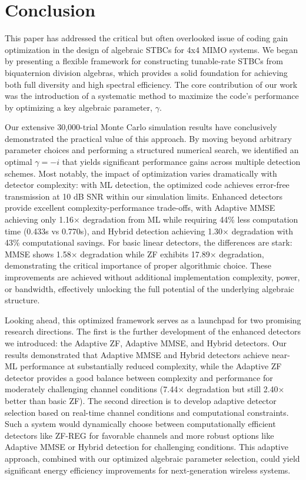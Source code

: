 \section{Conclusion}
This paper has addressed the critical but often overlooked issue of coding gain optimization in the design of algebraic STBCs for 4x4 MIMO systems. We began by presenting a flexible framework for constructing tunable-rate STBCs from biquaternion division algebras, which provides a solid foundation for achieving both full diversity and high spectral efficiency. The core contribution of our work was the introduction of a systematic method to maximize the code's performance by optimizing a key algebraic parameter, \(\gamma\).

Our extensive 30,000-trial Monte Carlo simulation results have conclusively demonstrated the practical value of this approach. By moving beyond arbitrary parameter choices and performing a structured numerical search, we identified an optimal \(\gamma = -i\) that yields significant performance gains across multiple detection schemes. Most notably, the impact of optimization varies dramatically with detector complexity: with ML detection, the optimized code achieves error-free transmission at 10 dB SNR within our simulation limits. Enhanced detectors provide excellent complexity-performance trade-offs, with Adaptive MMSE achieving only 1.16$\times$ degradation from ML while requiring 44\% less computation time (0.433s vs 0.770s), and Hybrid detection achieving 1.30$\times$ degradation with 43\% computational savings. For basic linear detectors, the differences are stark: MMSE shows 1.58$\times$ degradation while ZF exhibits 17.89$\times$ degradation, demonstrating the critical importance of proper algorithmic choice. These improvements are achieved without additional implementation complexity, power, or bandwidth, effectively unlocking the full potential of the underlying algebraic structure.

Looking ahead, this optimized framework serves as a launchpad for two promising research directions. The first is the further development of the enhanced detectors we introduced: the Adaptive ZF, Adaptive MMSE, and Hybrid detectors. Our results demonstrated that Adaptive MMSE and Hybrid detectors achieve near-ML performance at substantially reduced complexity, while the Adaptive ZF detector provides a good balance between complexity and performance for moderately challenging channel conditions (7.44× degradation but still 2.40× better than basic ZF). The second direction is to develop adaptive detector selection based on real-time channel conditions and computational constraints. Such a system would dynamically choose between computationally efficient detectors like ZF-REG for favorable channels and more robust options like Adaptive MMSE or Hybrid detection for challenging conditions. This adaptive approach, combined with our optimized algebraic parameter selection, could yield significant energy efficiency improvements for next-generation wireless systems.
